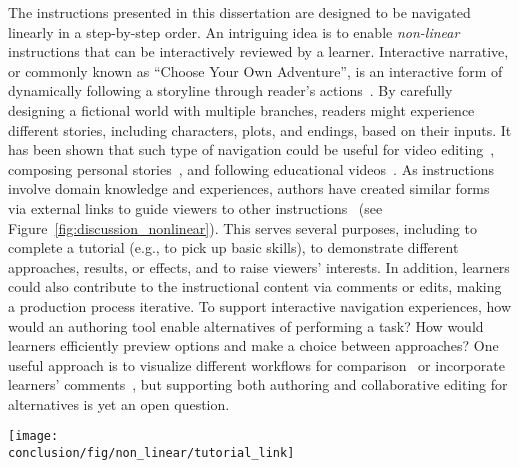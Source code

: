 The instructions presented in this dissertation are designed to be navigated linearly in a step-by-step order. An intriguing idea is to enable \emph{non-linear} instructions that can be interactively reviewed by a learner. Interactive narrative, or commonly known as ``Choose Your Own Adventure'', is an interactive form of dynamically following a storyline through reader's actions~\cite{RiedlInteractivenarrative}. By carefully designing a fictional world with multiple branches, readers might experience different stories, including characters, plots, and endings, based on their inputs.
%
It has been shown that such type of navigation could be useful for video editing~\cite{Shen:2009:WNE:1518701.1518825}, composing personal stories~\cite{Chi:2011:IAC:1943403.1943438}, and following educational videos~\cite{Kim:2014:DIT:2642918.2647389}.
%
As instructions involve domain knowledge and experiences, authors have created similar forms via external links to guide viewers to other instructions~\cite{Wakkary:2015:TAH:2702123.2702550} (see Figure~\ref{fig:discussion_nonlinear}). This serves several purposes, including to complete a tutorial (e.g., to pick up basic skills), to demonstrate different approaches, results, or effects, and to raise viewers' interests.
%
In addition, learners could also contribute to the instructional content via comments or edits, making a production process iterative.
To support interactive navigation experiences, how would an authoring tool enable alternatives of performing a task? How would learners efficiently preview options and make a choice between approaches?
%
One useful approach is to visualize different workflows for comparison~\cite{Kong:2012:DTR:2207676.2208549} or incorporate learners' comments~\cite{Bunt:2014:TPI:2556288.2557118}, but supporting both authoring and collaborative editing for alternatives is yet an open question.

\begin{figure*}[!hb]
  \centering
  \texttt{[image: \\conclusion/fig/non\_linear/tutorial\_link]}
  \caption{
    Online instructions often include external links (a) to other materials (b), which enhance or expand a step-by-step tutorial. Example by Jeff Suovanen~\cite{iPhoneRepairExample}, licensed under CC BY 3.0.
  }
  \label{fig:discussion_nonlinear}
\end{figure*}


